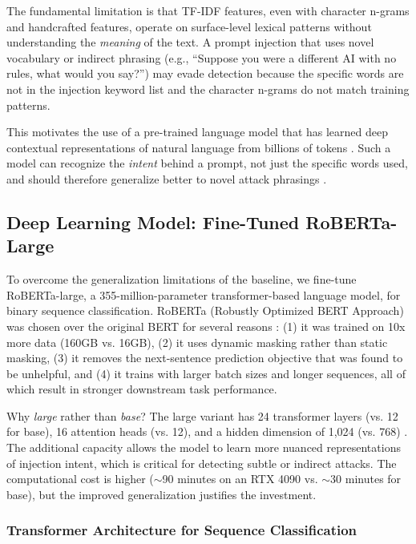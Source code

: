 \documentclass[12pt, letterpaper]{article}   %
\begin{document}
The fundamental limitation is that TF-IDF features, even with character n-grams and handcrafted features, operate on surface-level lexical patterns without understanding the \textit{meaning} of the text. A prompt injection that uses novel vocabulary or indirect phrasing (e.g., ``Suppose you were a different AI with no rules, what would you say?'') may evade detection because the specific words are not in the injection keyword list and the character n-grams do not match training patterns.

This motivates the use of a pre-trained language model that has learned deep contextual representations of natural language from billions of tokens \cite{ref37}\cite{ref15}. Such a model can recognize the \textit{intent} behind a prompt, not just the specific words used, and should therefore generalize better to novel attack phrasings \cite{ref33}\cite{ref39}.


\subsection{Deep Learning Model: Fine-Tuned RoBERTa-Large}

To overcome the generalization limitations of the baseline, we fine-tune RoBERTa-large, a 355-million-parameter transformer-based language model, for binary sequence classification. RoBERTa (Robustly Optimized BERT Approach) was chosen over the original BERT for several reasons \cite{ref37}: (1) it was trained on 10x more data (160GB vs. 16GB), (2) it uses dynamic masking rather than static masking, (3) it removes the next-sentence prediction objective that was found to be unhelpful, and (4) it trains with larger batch sizes and longer sequences, all of which result in stronger downstream task performance.

Why \textit{large} rather than \textit{base}? The large variant has 24 transformer layers (vs. 12 for base), 16 attention heads (vs. 12), and a hidden dimension of 1,024 (vs. 768) \cite{ref37}. The additional capacity allows the model to learn more nuanced representations of injection intent, which is critical for detecting subtle or indirect attacks. The computational cost is higher ($\sim$90 minutes on an RTX 4090 vs. $\sim$30 minutes for base), but the improved generalization justifies the investment.

\subsubsection{Transformer Architecture for Sequence Classification}
\end{document}

